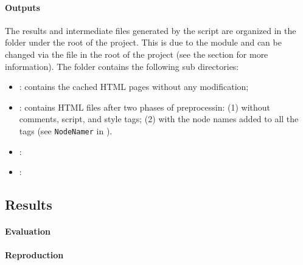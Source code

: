 \documentclass[10pt]{article}
\newcommand{\code}[1]{\colorbox{codegray}{\texttt{#1}}}
\begin{document}
\paragraph{Outputs}

The results and intermediate files generated by the script are organized in the folder  under the root of the project. This is due to the  module and can be changed via the file  in the root of the project (see the section  for more information). The folder contains the following sub directories: 

\begin{itemize}

    \item {}: contains the cached HTML pages without any modification;
        
    \item {}: contains HTML files after two phases of preprocessin: (1) without comments, script, and style tags; (2) with the node names added to all the tags (see \code{NodeNamer} in ).
        
    \item {}: 
        
    \item {}: 
    
\end{itemize}



\subsection{Results}

\paragraph{Evaluation}


\paragraph{Reproduction}





\newpage
 
\end{document}
